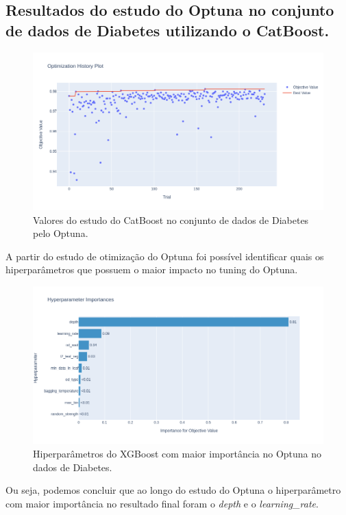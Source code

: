 \subsection{Resultados do estudo do Optuna no conjunto de dados de Diabetes utilizando o CatBoost.}
\begin{figure}[H]
 \caption{Valores do estudo do CatBoost no conjunto de dados de Diabetes pelo Optuna.}
 \label{fig:op:dia:trials:cat}
 \centering
 \includegraphics[scale=0.4]{images/optuna_catboost_dia.png}
\end{figure}
A partir do estudo de otimização do Optuna foi possível identificar quais os hiperparâmetros que possuem o maior impacto no tuning do Optuna.
\begin{figure}[H]
 \caption{Hiperparâmetros do XGBoost com maior importância no Optuna no dados de Diabetes.}
 \label{fig:op:dia:impo:cat}
 \centering
 \includegraphics[scale=0.4]{images/importance_catboost_dia.png}
\end{figure}
Ou seja, podemos concluir que ao longo do estudo do Optuna o hiperparâmetro com maior importância no resultado final foram o \textit{depth} e o \textit{learning\_rate}.

